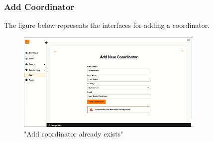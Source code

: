 \subsubsection{Add Coordinator}
The figure below represents the interfaces for adding a coordinator.
\begin{figure}[h!]
    \centering
    \includegraphics[width=0.8\textwidth]{images/adderr.JPG}
    \caption{"Add coordinator already exists"}
    \label{fig:"Add coordinator already exists"}
\end{figure}

